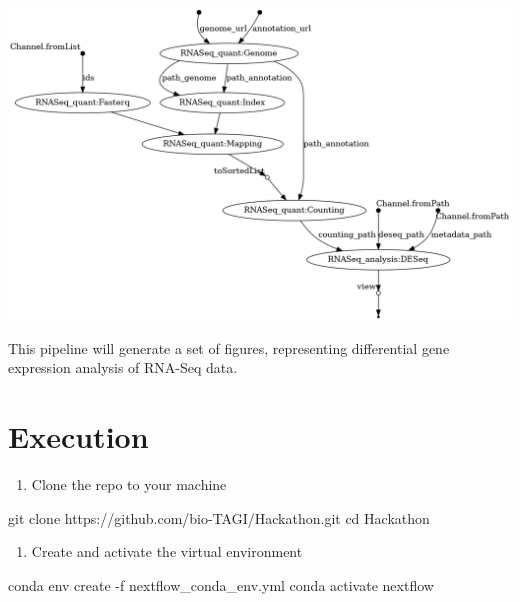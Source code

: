 \documentclass[
  openany]{book}
\newenvironment{Shaded}{\begin{snugshade}}{\end{snugshade}}
\newcommand{\AttributeTok}[1]{\textcolor[rgb]{0.77,0.63,0.00}{#1}}
\newcommand{\BuiltInTok}[1]{#1}
\newcommand{\ExtensionTok}[1]{#1}
\newcommand{\FunctionTok}[1]{\textcolor[rgb]{0.00,0.00,0.00}{#1}}
\newcommand{\NormalTok}[1]{#1}
\providecommand{\tightlist}{%
  \setlength{\itemsep}{0pt}\setlength{\parskip}{0pt}}
\begin{document}
\includegraphics{images/dag.png}

This pipeline will generate a set of figures, representing differential gene expression analysis of RNA-Seq data.

\hypertarget{execution}{%
\chapter{Execution}\label{execution}}

\begin{enumerate}
\def\labelenumi{\arabic{enumi}.}
\tightlist
\item
  Clone the repo to your machine
\end{enumerate}

\begin{Shaded}
\begin{Highlighting}[]
\FunctionTok{git}\NormalTok{ clone https://github.com/bio{-}TAGI/Hackathon.git}
\BuiltInTok{cd}\NormalTok{ Hackathon}
\end{Highlighting}
\end{Shaded}

\begin{enumerate}
\def\labelenumi{\arabic{enumi}.}
\setcounter{enumi}{1}
\tightlist
\item
  Create and activate the virtual environment
\end{enumerate}

\begin{Shaded}
\begin{Highlighting}[]
\ExtensionTok{conda}\NormalTok{ env create }\AttributeTok{{-}f}\NormalTok{ nextflow\_conda\_env.yml}
\ExtensionTok{conda}\NormalTok{ activate nextflow}
\end{Highlighting}
\end{Shaded}
\end{document}
